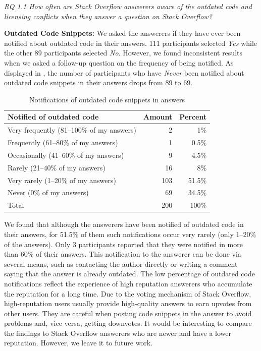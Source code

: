 \documentclass[10pt,journal,compsoc]{IEEEtran}
\begin{document}
\vspace{0.25cm}
\textit{RQ 1.1 How often are Stack Overflow
	answerers aware of the outdated code and 
	licensing conflicts when
	they answer a question on Stack Overflow?} 
\vspace{0.25cm}

\textbf{Outdated Code Snippets:} We asked the answerers if they have ever been notified about outdated code in
their answers. 111 participants selected \textit{Yes} while the other 89 participants
selected \textit{No}. However, we found inconsistent results when we asked a follow-up
question on the frequency of being notified. As displayed in
, the number of participants who have
\textit{Never} been notified about outdated code snippets in their answers drops
from 89 to 69.

\begin{table}
	\centering
	\caption{Notifications of outdated code snippets in answers}
	\label{tab:survey_code_snippet_outdated}
	\begin{tabular}{lrr}
		\toprule
		Notified of outdated code & Amount & Percent \\
		\midrule
		Very frequently (81--100\% of my answers) & 2 & 1\% \\
		Frequently (61--80\% of my answers) & 1 & 0.5\% \\
		Occasionally (41--60\% of my answers) & 9 & 4.5\% \\
		Rarely (21--40\% of my answers) & 16 & 8\% \\
		Very rarely (1--20\% of my answers) & 103 & 51.5\% \\
		Never (0\% of my answers) & 69 & 34.5\% \\
		\midrule
		Total & 200 & 100\% \\
		\bottomrule
	\end{tabular}
\end{table}

We found that although the answerers have been notified of outdated code in their
answers, for 51.5\% of them such notifications occur very rarely (only 1--20\%
of the answers). Only 3 participants reported that they were notified in more
than 60\% of their answers. This notification to the answerer can be done 
via several means, such as contacting the author directly or 
writing a comment saying that the answer is
already outdated.
The low percentage of outdated code notifications
reflect the experience of high reputation answerers who accumulate the reputation for a
long time. Due to the voting mechanism of Stack Overflow, high-reputation users
usually provide high-quality answers to earn upvotes from other users. They are
careful when posting code snippets in the answer to avoid problems and, vice versa, 
getting downvotes. It would be interesting to compare the findings to
Stack Overflow answerers who are newer and have a lower reputation. However, we
leave it to future work.
\end{document}
